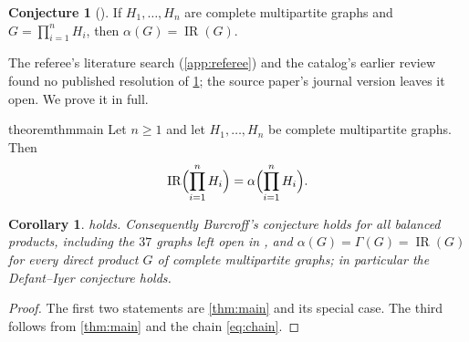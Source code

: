 \documentclass[11pt,a4paper]{article}
\theoremstyle{plain}
\newtheorem{corollary}[theorem]{Corollary}
\theoremstyle{definition}
\newtheorem{conjecture}[theorem]{Conjecture}
\theoremstyle{remark}
\newcommand{\IR}{\operatorname{IR}}
\begin{document}
\begin{conjecture}[{\cite[Conjecture~1.2]{AD20}}]\label{conj:AD12}
If $H_1,\ldots,H_n$ are complete multipartite graphs and $G=\prod_{i=1}^nH_i$, then $\alpha(G)=\IR(G)$.
\end{conjecture}

The referee's literature search (\cref{app:referee}) and the catalog's earlier review found no published resolution of \cref{conj:AD12}; the source paper's journal version \cite{AD20} leaves it open. We prove it in full.

\begin{restatable}{theorem}{thmmain}\label{thm:main}
Let $n\ge1$ and let $H_1,\dots,H_n$ be complete multipartite graphs. Then
\[
\IR\Bigl(\prod_{i=1}^nH_i\Bigr)=\alpha\Bigl(\prod_{i=1}^nH_i\Bigr).
\]
\end{restatable}

\begin{corollary}\label{cor:main}
 holds. Consequently Burcroff's conjecture \cite[Conjecture~1.1]{AD20} holds for all balanced products, including the $37$ graphs left open in \cite{AD20}, and $\alpha(G)=\Gamma(G)=\IR(G)$ for every direct product $G$ of complete multipartite graphs; in particular the Defant--Iyer conjecture \cite{DI18} holds.
\end{corollary}
\begin{proof}
The first two statements are \cref{thm:main} and its special case. The third follows from \cref{thm:main} and the chain \eqref{eq:chain}.
\end{proof}
\end{document}
